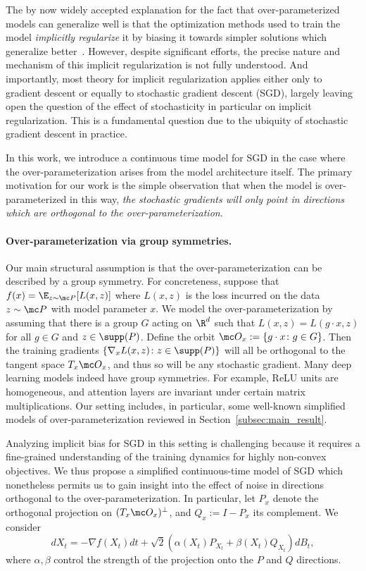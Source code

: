 \documentclass[twoside,a4paper,11pt]{article}
\theoremstyle{plain}
\begin{document}
The by now widely accepted explanation for the fact
that over-parameterized models can generalize well
is that
the optimization methods used to train the model
{\it implicitly regularize} it by biasing it towards simpler solutions which generalize better~\cite{neyshabur2014search}.
However, despite significant
efforts,
the precise nature and mechanism of this implicit
regularization is not fully understood. 
And importantly, most theory for implicit regularization
applies either only to gradient descent or equally to stochastic
gradient descent (SGD), largely leaving open the question 
of the effect of stochasticity in particular on implicit regularization.
This is
a fundamental question due to the ubiquity of stochastic gradient
descent in practice.

In this work, we introduce a continuous
time model for SGD
in the case where the over-parameterization
arises from
the model architecture itself.
The primary motivation for our work
is the simple observation that
when the model is over-parameterized in this way,
{\it the stochastic gradients will only point in directions which are orthogonal to the over-parameterization}.

\paragraph*{Over-parameterization via group symmetries.}
Our main structural assumption is that
the over-parameterization can be described
by a group symmetry.
For concreteness, suppose that
$f(x) = \E_{z \sim \mc P}[L(x, z)]$ where $L(x ,z)$ is the loss
incurred on the data $z \sim \mc P$ with model parameter $x$.
We model the over-parameterization
by assuming that there is a group $G$ acting on $\R^d$
such that $L(x, z) = L(g\cdot x, z)$ for all $g \in G$
and $z \in \supp(P)$.
Define the orbit $\mc O_x := \{g\cdot x \colon g \in G\}$.
Then the training gradients $\{\nabla_x L(x, z) \colon z \in \supp(P)\}$
will all be orthogonal to the tangent space $T_x \mc O_x$,
and thus so will be any stochastic gradient.
Many deep learning models indeed have group symmetries.
For example, ReLU units are homogeneous,
and attention layers are invariant under
certain matrix multiplications.
Our setting includes, in particular,
some well-known simplified models
of over-parameterization reviewed in
Section~\ref{subsec:main_result}.

Analyzing implicit bias for SGD in this setting is challenging
because it requires a fine-grained
understanding of the training dynamics for highly non-convex
objectives.
We thus propose a simplified continuous-time
model of SGD which nonetheless permits us
to gain insight into the effect of noise
in directions
orthogonal to the over-parameterization.
In particular, let $P_x$ denote the orthogonal
projection on $(T_x \mc O_x)^{\perp}$, and 
$Q_x := I - P_x$ its complement.
We consider
\begin{equation}\label{eqn:projected_Langevin_continuous}
dX_t = -\nabla f(X_t) dt + \sqrt{2}(\alpha(X_t)P_{X_t}
+ \beta(X_t)Q_{X_t})dB_t,
\end{equation}
where $\alpha, \beta$ control the
strength of the projection onto the $P$ and $Q$ directions.
\end{document}
